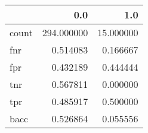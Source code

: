 \begin{tabular}{lrr}
\toprule
{} &         0.0 &        1.0 \\
\midrule
count &  294.000000 &  15.000000 \\
fnr   &    0.514083 &   0.166667 \\
fpr   &    0.432189 &   0.444444 \\
tnr   &    0.567811 &   0.000000 \\
tpr   &    0.485917 &   0.500000 \\
bacc  &    0.526864 &   0.055556 \\
\bottomrule
\end{tabular}
